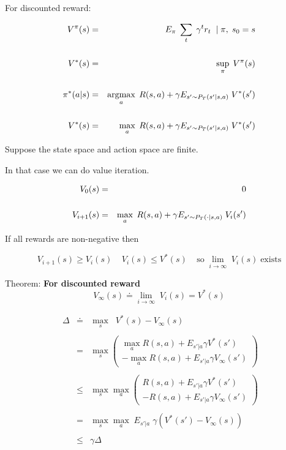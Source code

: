 {

For discounted reward:

\begin{eqnarray*}
  V^\pi(s) & = & E_\pi\;\sum_t \;\gamma^t r_t  \;\;|\; \pi, \; s_0 = s \\
  \\
  V^*(s) & = & \sup_\pi \;V^\pi(s) \\
  \\
  \pi^*(a|s) & = & \operatorname*{argmax}_a\;R(s,a) + \gamma E_{s' \sim P_T(s'|s,a)}\;V^*(s') \\
  \\
  V^*(s) & = & \max_a\; R(s,a) + \gamma E_{s' \sim P_T(s'|s,a)}\;V^*(s')
\end{eqnarray*}


Suppose the state space and action space are finite.

\vfill
In that case we can do value iteration.

\begin{eqnarray*}
  V_0(s) & = & 0 \\
  \\
  V_{i+1}(s) & = & \max_a\; R(s,a) + \gamma E_{s' \sim P_T(\cdot|s,a)}\;V_i(s')
\end{eqnarray*}

\vfill
If all rewards are non-negative then

$$V_{i+1}(s) \geq V_i(s)\;\;\;\;V_i(s) \leq V^*(s)\;\;\;\;\mathrm{so}\;\lim_{i \rightarrow \infty}\;V_i(s)\;\mathrm{exists}$$


Theorem: {\bf For discounted reward}
\vfill
$$V_\infty(s) \doteq \lim_{i \rightarrow \infty}\;V_i(s) = V^*(s)$$


\begin{eqnarray*}
  \;\Delta & \doteq & \max_s\;\;V^*(s) - V_\infty(s) \\
  \\
  & = & \max_s \left(\begin{array}{l} \max_a R(s,a) + E_{s'|a} \gamma V^*(s') \\ - \max_a R(s,a) + E_{s'|a} \gamma V_\infty(s')\end{array}\right) \\
  \\
    & \leq & \max_s \max_a \left(\begin{array}{l} R(s,a) + E_{s'|a} \gamma V^*(s') \\ - R(s,a) + E_{s'|a} \gamma V_\infty(s')\end{array}\right) \\
  \\
  & = & \max_s \max_a \;E_{s'|a}\; \gamma (V^*(s') - V_\infty(s)) \\
  \\  
  & \leq & \gamma \Delta
\end{eqnarray*}


}
